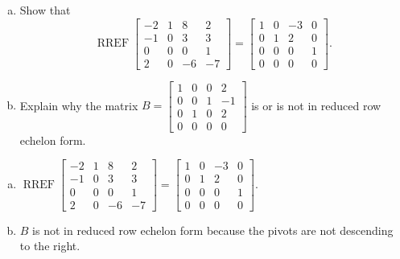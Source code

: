 
\begin{exerciseStatement}

\begin{enumerate}[(a)]
\item Show that \[\operatorname{RREF} \left[\begin{array}{cccc}
-2 & 1 & 8 & 2 \\
-1 & 0 & 3 & 3 \\
0 & 0 & 0 & 1 \\
2 & 0 & -6 & -7
\end{array}\right] = \left[\begin{array}{cccc}
1 & 0 & -3 & 0 \\
0 & 1 & 2 & 0 \\
0 & 0 & 0 & 1 \\
0 & 0 & 0 & 0
\end{array}\right] .\]
\item Explain why the matrix \(B= \left[\begin{array}{cccc}
1 & 0 & 0 & 2 \\
0 & 0 & 1 & -1 \\
0 & 1 & 0 & 2 \\
0 & 0 & 0 & 0
\end{array}\right] \) is or is not in reduced row echelon form.
\end{enumerate}
    
\end{exerciseStatement}
    
\begin{exerciseAnswer} 

\begin{enumerate}[(a)]
\item \(\operatorname{RREF} \left[\begin{array}{cccc}
-2 & 1 & 8 & 2 \\
-1 & 0 & 3 & 3 \\
0 & 0 & 0 & 1 \\
2 & 0 & -6 & -7
\end{array}\right] = \left[\begin{array}{cccc}
1 & 0 & -3 & 0 \\
0 & 1 & 2 & 0 \\
0 & 0 & 0 & 1 \\
0 & 0 & 0 & 0
\end{array}\right] .\)
\item \(B\) is not in reduced row echelon form because the pivots are not descending to the right. 
\end{enumerate}
    
\end{exerciseAnswer}
    
